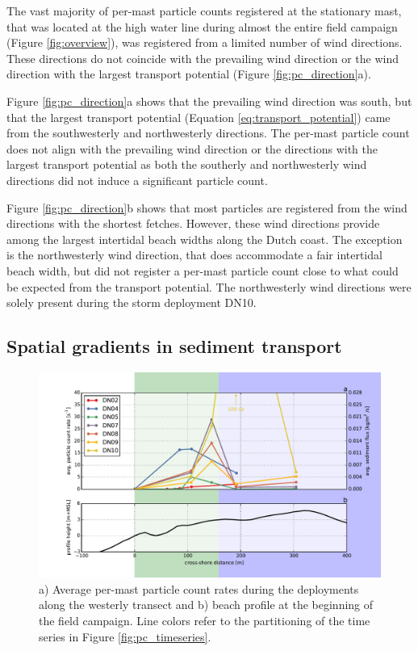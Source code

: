 The vast majority of per-mast particle counts registered at the
stationary mast, that was located at the high water line during almost
the entire field campaign (Figure \ref{fig:overview}), was registered
from a limited number of wind directions. These directions do not
coincide with the prevailing wind direction or the wind direction with
the largest transport potential (Figure \ref{fig:pc_direction}a).

Figure \ref{fig:pc_direction}a shows that the prevailing wind
direction was south, but that the largest transport potential
(Equation \ref{eq:transport_potential}) came from the southwesterly
and northwesterly directions. The per-mast particle count does not
align with the prevailing wind direction or the directions with the
largest transport potential as both the southerly and northwesterly
wind directions did not induce a significant particle count.

Figure \ref{fig:pc_direction}b shows that most particles are
registered from the wind directions with the shortest
fetches. However, these wind directions provide among the largest
intertidal beach widths along the Dutch coast. The exception is the
northwesterly wind direction, that does accommodate a fair intertidal
beach width, but did not register a per-mast particle count close to
what could be expected from the transport potential. The northwesterly
wind directions were solely present during the storm deployment DN10.

\subsection{Spatial gradients in sediment transport}

\begin{figure}
 \centering
  \includegraphics[width=\columnwidth]{../Figures/particlecounts_transects}
  \caption{a) Average per-mast particle count rates during the
    deployments along the westerly transect and b) beach profile at
    the beginning of the field campaign. Line colors refer to the
    partitioning of the time series in Figure
    \ref{fig:pc_timeseries}.}
  \label{fig:pc_transect}
\end{figure}

